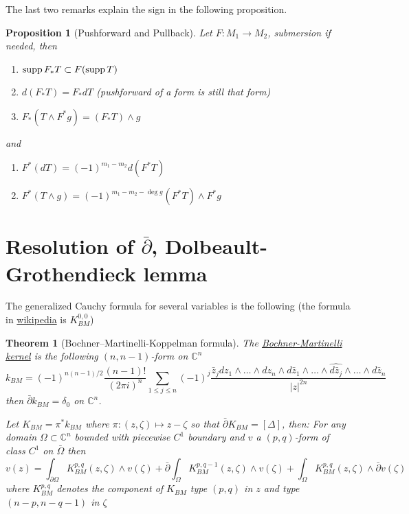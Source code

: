 \documentclass[11pt]{article}
\newtheorem{theorem}{Theorem}
\newtheorem{proposition}{Proposition}[theorem]
\newcommand{\supp}{\mathop{\rm supp}\nolimits}
\begin{document}
The last two remarks explain the sign in the following proposition.

\begin{proposition}[Pushforward and Pullback]
Let \(F: M_1 \longrightarrow M_2\), submersion if needed, then
\begin{enumerate}
\item \(\supp F_* T \subset F(\supp T)\)
\item \(d(F_* T) = F_* dT\) (pushforward of a form is still that form)
\item \(F_*(T\wedge F^* g) = (F_*T)\wedge g\)
\end{enumerate}
and
\begin{enumerate}
\item \(F^*(dT) = (-1)^{m_1-m_2} d(F^* T)\)
\item \(F^*(T\wedge g) = (-1)^{m_1-m_2 -\deg g}(F^* T)\wedge F^* g\)
\end{enumerate}
\end{proposition}






\section{Resolution of \(\bar\partial\), Dolbeault-Grothendieck lemma}
\label{sec:org1c81c81}
The generalized Cauchy formula for several variables is the following (the formula in
\href{https://en.wikipedia.org/wiki/Bochner–Martinelli\_formula}{wikipedia} is \(K^{0,0}_{BM}\))

\begin{theorem}[Bochner–Martinelli-Koppelman formula]
\label{thm:koppelman}
The \uline{Bochner-Martinelli kernel} is the following \((n,n-1)\)-form on \(\mathbb{C}^n\)
\[
k_{BM} = (-1)^{n(n-1)/2}\frac{(n-1)!}{(2\pi i)^n}\sum_{1\leq j\leq n} (-1)^j \frac{\bar
z_j dz_1\wedge \dots\wedge dz_n\wedge d\bar z_1\wedge\dots \wedge \widehat{d\bar z_j} \wedge \dots \wedge d\bar z_n}{|z|^{2n}}
\]
then \(\bar \partial k_{BM} = \delta_0\) on \(\mathbb{C}^n\).

Let \(K_{BM} = \pi^* k_{BM}\) where \(\pi: (z,\zeta)\mapsto z-\zeta\) so that \(\bar \partial K_{BM} = [\Delta]\), then: For any domain \(\Omega\subset \mathbb{C}^n\)
bounded with piecewise \(C^1\) boundary and \(v\) a \((p,q)\)-form of class \(C^1\) on \(\bar \Omega\) then
\[
v(z) = \int_{\partial\Omega}K^{p,q}_{BM}(z,\zeta)\wedge v(\zeta) + \bar \partial
\int_{\Omega} K^{p,q-1}_{BM}(z,\zeta)\wedge v(\zeta) + \int_\Omega
K^{p,q}_{BM}(z,\zeta)\wedge \bar \partial v(\zeta)
\]
where \(K^{p,q}_{BM}\) denotes the component of \(K_{BM}\) type \((p,q)\) in \(z\)
and type \((n-p, n-q-1)\) in \(\zeta\)
\end{theorem}
\end{document}
